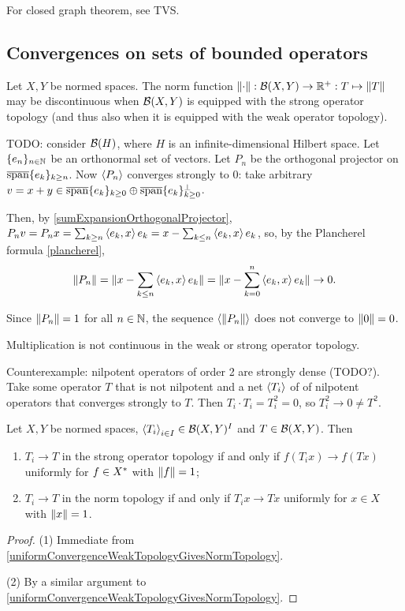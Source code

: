 For closed graph theorem, see TVS.

\subsection{Convergences on sets of bounded operators}
\begin{example}
Let $X, Y$ be normed spaces. The norm function $\lVert\cdot\rVert: \operatorname{\mathcal{B}}(X,Y)\to \mathbb{R}^+: T\mapsto \lVert T\rVert$ may be discontinuous when $\operatorname{\mathcal{B}}(X,Y)$ is equipped with the strong operator topology (and thus also when it is equipped with the weak operator topology).

TODO: consider $\operatorname{\mathcal{B}}(H)$, where $H$ is an infinite-dimensional Hilbert space. Let $\{e_n\}_{n\in\mathbb{N}}$ be an orthonormal set of vectors. Let $P_n$ be the orthogonal projector on $\overline{\operatorname{span}}\{e_k\}_{k\geq n}$. Now $\left\langle P_n \right\rangle$ converges strongly to $0$:
take arbitrary $v = x+y \in \overline{\operatorname{span}}\{e_k\}_{k\geq 0} \oplus \overline{\operatorname{span}}\{e_k\}_{k\geq 0}^\perp$.

Then, by \ref{sumExpansionOrthogonalProjector}, $P_nv = P_nx = \sum_{k\geq n}\left\langle e_k, x \right\rangle e_k = x - \sum_{k\leq n}\left\langle e_k, x \right\rangle e_k$, so, by the Plancherel formula \ref{plancherel},
\[ \lVert P_n\rVert = \lVert x - \sum_{k\leq n}\left\langle e_k, x \right\rangle e_k\rVert = \lVert x - \sum_{k=0}^n\left\langle e_k, x \right\rangle e_k\rVert \to 0. \]

Since $\lVert P_n\rVert = 1$ for all $n\in\mathbb{N}$, the sequence $\left\langle \lVert P_n\rVert \right\rangle$ does not converge to $\lVert0\rVert = 0$.
\end{example}

\begin{example}
Multiplication is not continuous in the weak or strong operator topology.

Counterexample: nilpotent operators of order 2 are strongly dense (TODO?). Take some operator $T$ that is not nilpotent and a net $\left\langle T_i \right\rangle$ of of nilpotent operators that converges strongly to $T$. Then $T_i\cdot T_i = T_i^2 = 0$, so $T_i^2 \to 0 \neq T^2$.
\end{example}

\begin{lemma}
Let $X, Y$ be normed spaces, $\left\langle T_i \right\rangle_{i\in I} \in \operatorname{\mathcal{B}}(X, Y)^I$ and $T \in \operatorname{\mathcal{B}}(X, Y)$. Then
\begin{enumerate}
\item $T_i \to T$ in the strong operator topology \textup{if and only if} $f(T_ix) \to f(Tx)$ uniformly for $f\in{X}^*$ with $\lVert f\rVert = 1$;
\item $T_i \to T$ in the norm topology \textup{if and only if} $T_ix\to Tx$ uniformly for $x\in X$ with $\lVert x\rVert = 1$.
\end{enumerate}
\end{lemma}
\begin{proof}
(1) Immediate from \ref{uniformConvergenceWeakTopologyGivesNormTopology}.

(2) By a similar argument to \ref{uniformConvergenceWeakTopologyGivesNormTopology}.
\end{proof}

